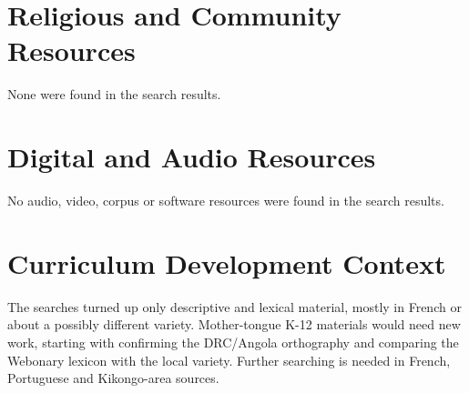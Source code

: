 \documentclass[12pt]{article}
\begin{document}
\section{Religious and Community Resources}
None were found in the search results.

\section{Digital and Audio Resources}
No audio, video, corpus or software resources were found in the search results.

\section{Curriculum Development Context}
The searches turned up only descriptive and lexical material, mostly in French or about a possibly different variety. Mother-tongue K-12 materials would need new work, starting with confirming the DRC/Angola orthography and comparing the Webonary lexicon with the local variety. Further searching is needed in French, Portuguese and Kikongo-area sources.
\end{document}
